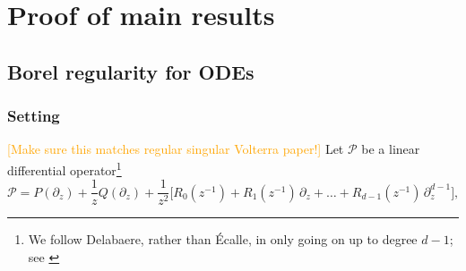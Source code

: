 \documentclass{article}
\theoremstyle{definition}
\newcommand{\R}{\mathbb{R}}
\newcommand{\C}{\mathbb{C}}
\newtheorem{remark}[definition]{Remark}
\begin{document}


\section{Proof of main results}
\subsection{Borel regularity for ODEs}\label{borel_reg-ODE}

\subsubsection{Setting}\label{setting-ODE}
\textcolor{orange}{[Make sure this matches regular singular Volterra paper!]} Let $\mathcal{P}$ be a linear differential operator\footnote{ We follow Delabaere, rather than \'Ecalle, in only going on up to degree $d-1$; see \cite[Footnote~1 in Section 5.2.2.1]{diverg-resurg-iii}}
\begin{equation}
\mathcal{P} = P(\partial_z) + \frac{1}{z} Q(\partial_z) + \frac{1}{z^2}\big[ R_0(z^{-1}) + R_1(z^{-1})\,\partial_z + \ldots + R_{d-1}(z^{-1})\,\partial_z^{d-1} \big],
\end{equation}
\end{document}
